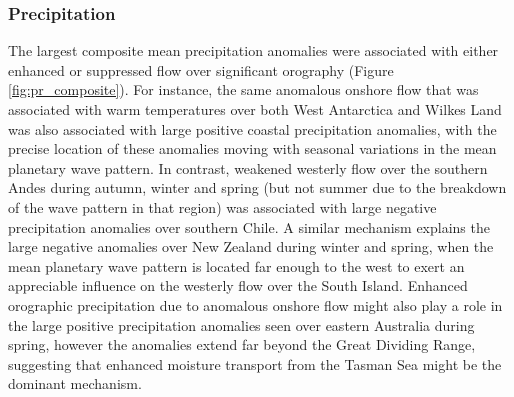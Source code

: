 \subsubsection{Precipitation}

The largest composite mean precipitation anomalies were associated with either enhanced or suppressed flow over significant orography (Figure \ref{fig:pr_composite}). For instance, the same anomalous onshore flow that was associated with warm temperatures over both West Antarctica and Wilkes Land was also associated with large positive coastal precipitation anomalies, with the precise location of these anomalies moving with seasonal variations in the mean planetary wave pattern. In contrast, weakened westerly flow over the southern Andes during autumn, winter and spring (but not summer due to the breakdown of the wave pattern in that region) was associated with large negative precipitation anomalies over southern Chile. A similar mechanism explains the large negative anomalies over New Zealand during winter and spring, when the mean planetary wave pattern is located far enough to the west to exert an appreciable influence on the westerly flow over the South Island. Enhanced orographic precipitation due to anomalous onshore flow might also play a role in the large positive precipitation anomalies seen over eastern Australia during spring, however the anomalies extend far beyond the Great Dividing Range, suggesting that enhanced moisture transport from the Tasman Sea might be the dominant mechanism. 
